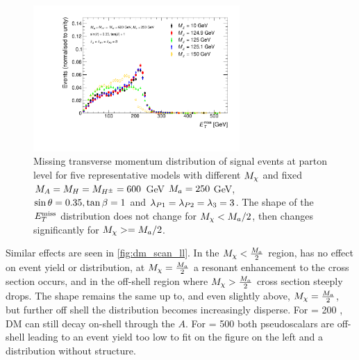 \begin{figure}[tbp]
\centering
\includegraphics[width=0.7\textwidth]{texinputs/04_grid/figures/monoHbb_mDM_scan_MET_liny_norm2one.pdf}
\caption[$\MET$ distribution in \monohbb events for different $\mDM$]
{
Missing transverse momentum distribution  of \monohbb signal events at parton level for five representative models with different $\mDM$
and fixed $M_{A} = M_{H} = M_{H^{\pm}} = 600 $ GeV $M_{a} = 250$ GeV, $ \sin\theta = 0.35, \tan\beta = 1$ and $ \lambda_{P1} = \lambda_{P2} = \lambda_{3} = 3 $. 
The shape of the $\MET$ distribution does not change for $M_{\chi} < M_{a}/2$, then changes significantly for $M_{\chi}>=M_{a}/2$.
\label{fig:monoHbb_mDM_scan_met}
}
\end{figure}

Similar effects are seen in \autoref{fig:dm_scan_ll}. In the $M_{\chi} < \frac{M_{a}}{2}$ region, \mDM has no effect on event yield or \MET distribution, at $M_{\chi} = \frac{M_{a}}{2}$ a resonant enhancement to the cross section occurs, and in the off-shell region where  $M_{\chi} > \frac{M_{a}}{2}$ cross section steeply drops.  The \MET shape remains the same up to, and even slightly above, $M_{\chi} = \frac{M_{a}}{2}$, but further off shell the \MET distribution becomes increasingly disperse.  For \mDM = 200 \GeV, DM can still decay on-shell through the $A$.  For \mDM = 500 \GeV both pseudoscalars are off-shell leading to an event yield too low to fit on the figure on the left and a \MET distribution without structure.

